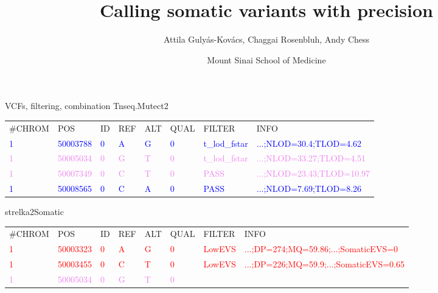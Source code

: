 \documentclass{beamer}
\title{Calling somatic variants with precision}
\author{Attila Guly\'as-Kov\'acs, Chaggai Rosenbluh, Andy Chess}
\date{Mount Sinai School of Medicine}
\begin{document}
\maketitle

\begin{frame}{VCFs, filtering, combination}
\normalsize
Tnseq.Mutect2
\tiny
\begin{tabular}{llllllll}
\#CHROM & POS & ID & REF & ALT & QUAL & FILTER & INFO \\
\textcolor{blue}{1} &
\textcolor{blue}{50003788} &
\textcolor{blue}{0} &
\textcolor{blue}{A} &
\textcolor{blue}{G} &
\textcolor{blue}{0} &
\textcolor{blue}{t\_lod\_fstar} &
\textcolor{blue}{...;NLOD=30.4;TLOD=4.62} \\
\textcolor{violet}{1} &
\textcolor{violet}{50005034} &
\textcolor{violet}{0} &
\textcolor{violet}{G} &
\textcolor{violet}{T} &
\textcolor{violet}{0} &
\textcolor{violet}{t\_lod\_fstar} &
\textcolor{violet}{...;NLOD=33.27;TLOD=4.51} \\
\textcolor{violet}{1} &
\textcolor{violet}{50007349} &
\textcolor{violet}{0} &
\textcolor{violet}{C} &
\textcolor{violet}{T} &
\textcolor{violet}{0} &
\textcolor{violet}{PASS} &
\textcolor{violet}{...;NLOD=23.43;TLOD=10.97} \\
\textcolor{blue}{1} &
\textcolor{blue}{50008565} &
\textcolor{blue}{0} &
\textcolor{blue}{C} &
\textcolor{blue}{A} &
\textcolor{blue}{0} &
\textcolor{blue}{PASS} &
\textcolor{blue}{...;NLOD=7.69;TLOD=8.26} \\
\end{tabular}
\vfill
\normalsize
strelka2Somatic
\tiny
\begin{tabular}{llllllll}
\#CHROM & POS & ID & REF & ALT & QUAL & FILTER & INFO \\
\textcolor{red}{1} &
\textcolor{red}{50003323} &
\textcolor{red}{0} &
\textcolor{red}{A} &
\textcolor{red}{G} &
\textcolor{red}{0} &
\textcolor{red}{LowEVS} &
\textcolor{red}{...;DP=274;MQ=59.86;...;SomaticEVS=0} \\
\textcolor{red}{1} &
\textcolor{red}{50003455} &
\textcolor{red}{0} &
\textcolor{red}{C} &
\textcolor{red}{T} &
\textcolor{red}{0} &
\textcolor{red}{LowEVS} &
\textcolor{red}{...;DP=226;MQ=59.9;...;SomaticEVS=0.65} \\
\textcolor{violet}{1} &
\textcolor{violet}{50005034} &
\textcolor{violet}{0} &
\textcolor{violet}{G} &
\textcolor{violet}{T} &
\textcolor{violet}{0} &

\end{tabular}
\end{frame}
\end{document}
